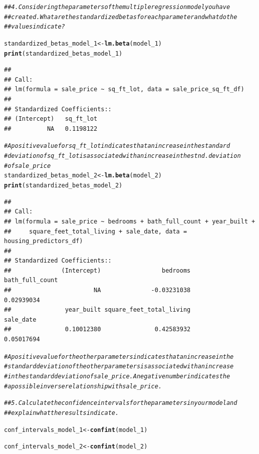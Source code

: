 \documentclass{article}\usepackage[]{graphicx}\usepackage[]{xcolor}
\makeatletter
\newcommand{\hlcom}[1]{\textcolor[rgb]{0.678,0.584,0.686}{\textit{#1}}}%
\newcommand{\hlstd}[1]{\textcolor[rgb]{0.345,0.345,0.345}{#1}}%
\newcommand{\hlkwb}[1]{\textcolor[rgb]{0.69,0.353,0.396}{#1}}%
\newcommand{\hlkwd}[1]{\textcolor[rgb]{0.737,0.353,0.396}{\textbf{#1}}}%
\newenvironment{kframe}{%
 \def\at@end@of@kframe{}%
 \ifinner\ifhmode%
  \def\at@end@of@kframe{\end{minipage}}%
  \begin{minipage}{\columnwidth}%
 \fi\fi%
 \def\FrameCommand##1{\hskip\@totalleftmargin \hskip-\fboxsep
 \colorbox{shadecolor}{##1}\hskip-\fboxsep
     \hskip-\linewidth \hskip-\@totalleftmargin \hskip\columnwidth}%
 \MakeFramed {\advance\hsize-\width
   \@totalleftmargin\z@ \linewidth\hsize
   \@setminipage}}%
 {\par\unskip\endMakeFramed%
 \at@end@of@kframe}
\newenvironment{knitrout}{}{} %
\makeatother
\begin{document}
\begin{knitrout}
\begin{kframe}
\begin{alltt}
\hlcom{## 4. Considering the parameters of the multiple regression model you have }
\hlcom{## created. What are the standardized betas for each parameter and what do the }
\hlcom{## values indicate?}



\hlstd{standardized_betas_model_1} \hlkwb{<-} \hlkwd{lm.beta}\hlstd{(model_1)}
\hlkwd{print}\hlstd{(standardized_betas_model_1)}
\end{alltt}
\begin{verbatim}
## 
## Call:
## lm(formula = sale_price ~ sq_ft_lot, data = sale_price_sq_ft_df)
## 
## Standardized Coefficients::
## (Intercept)   sq_ft_lot 
##          NA   0.1198122
\end{verbatim}
\begin{alltt}
\hlcom{# A positive value for sq_ft_lot indicates that an increase in the standard}
\hlcom{# deviation of sq_ft_lot is associated with an increase in the stnd. deviation}
\hlcom{# of sale_price}
\hlstd{standardized_betas_model_2} \hlkwb{<-} \hlkwd{lm.beta}\hlstd{(model_2)}
\hlkwd{print}\hlstd{(standardized_betas_model_2)}
\end{alltt}
\begin{verbatim}
## 
## Call:
## lm(formula = sale_price ~ bedrooms + bath_full_count + year_built + 
##     square_feet_total_living + sale_date, data = housing_predictors_df)
## 
## Standardized Coefficients::
##              (Intercept)                 bedrooms          bath_full_count 
##                       NA              -0.03231038               0.02939034 
##               year_built square_feet_total_living                sale_date 
##               0.10012380               0.42583932               0.05017694
\end{verbatim}
\begin{alltt}
\hlcom{# A positive value for the other parameters indicates that an increase in the }
\hlcom{# standard deviation of the other parameters is associated with an increase }
\hlcom{# in the standard deviation of sale_price.  A negative number indicates the }
\hlcom{# a possible inverse relationship with sale_price.}

\hlcom{## 5. Calculate the confidence intervals for the parameters in your model and }
\hlcom{## explain what the results indicate.}


\hlstd{conf_intervals_model_1} \hlkwb{<-} \hlkwd{confint}\hlstd{(model_1)}

\hlstd{conf_intervals_model_2} \hlkwb{<-} \hlkwd{confint}\hlstd{(model_2)}


\end{alltt}
\end{kframe}
\end{knitrout}
\end{document}
